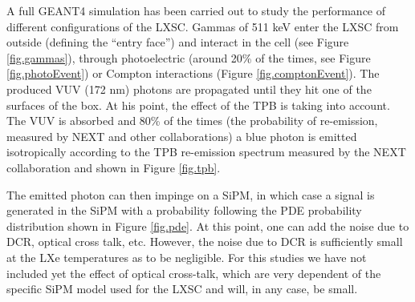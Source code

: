 A full GEANT4 simulation has been carried out to study the performance of different configurations of the LXSC. Gammas of 511 keV enter the LXSC from outside (defining the ``entry face'') and interact in the cell (see Figure \ref{fig.gammas}), through photoelectric (around 20\% of the times, see Figure \ref{fig.photoEvent}) or Compton interactions (Figure \ref{fig.comptonEvent}). The produced VUV (172 nm) photons are propagated until they hit one of the surfaces of the box. At his point, the effect of the TPB is taking into account. The VUV is absorbed and 80\% of the times (the probability of re-emission, measured by NEXT and other collaborations) a blue photon is emitted isotropically according to the TPB re-emission spectrum measured by the NEXT collaboration and shown in Figure \ref{fig.tpb}.

The emitted photon can then impinge on a SiPM, in which case a signal is generated in the SiPM with a probability following the PDE probability distribution shown in Figure \ref{fig.pde}. At this point, one can add the noise due to DCR, optical cross talk, etc. However, the noise due to DCR is sufficiently small at the LXe temperatures as to be negligible. For this studies we have not included yet the effect of optical cross-talk, which are very dependent of the specific SiPM model used for the LXSC and will, in any case, be small.  

%




